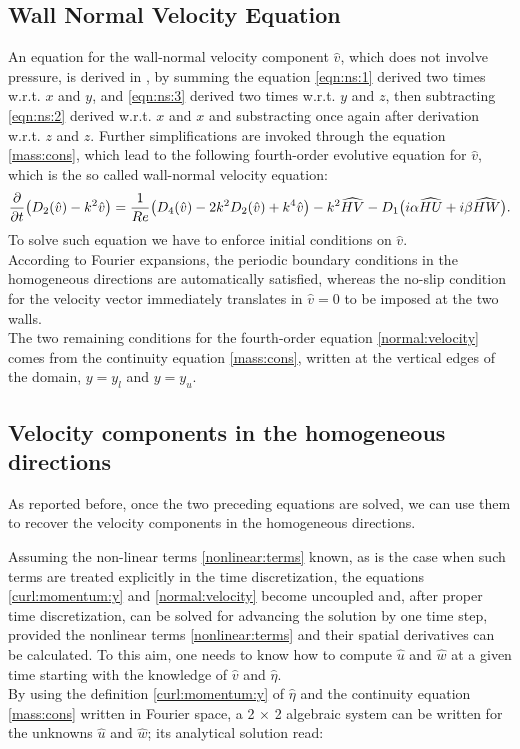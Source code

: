 \subsection{Wall Normal Velocity Equation}
An equation for the wall-normal velocity component $\hat{v}$, which does not involve pressure, is derived in \cite{kim_moin_moser}, by summing the equation \eqref{eqn:ns:1} derived two times w.r.t. $x$ and $y$, and \eqref{eqn:ns:3} derived two times w.r.t. $y$ and $z$, then subtracting \eqref{eqn:ns:2} derived w.r.t. $x$ and $x$ and substracting once again after derivation w.r.t. $z$ and $z$.
Further simplifications are invoked through the equation \eqref{mass:cons}, which lead to the following fourth-order evolutive equation for $\hat{v}$, which is the so called wall-normal velocity equation:
\begin{equation}
\frac{\partial}{\partial t} \big( D_{2}(\hat{v}) - k^{2} \hat{v} \big) = \frac{1}{Re} \big( D_{4}(\hat{v}) - 2k^{2} D_{2}(\hat{v}) + k^{4} \hat{v} \big)  \\
	-k^{2} \widehat{HV} - D_{1} \big(  i \alpha \widehat{HU} + i \beta \widehat{HW} \big).
\label{normal:velocity}
\end{equation}
To solve such equation we have to enforce initial conditions on $\hat{v}$.\\
According to Fourier expansions, the periodic boundary conditions in the homogeneous directions are automatically satisfied, whereas the no-slip condition for the velocity vector immediately translates in $\hat{v} = 0$ to be imposed at the two walls.\\
The two remaining conditions for the fourth-order equation \eqref{normal:velocity} comes from the continuity equation \eqref{mass:cons}, written at the vertical edges of the domain, $y= y_{l}$ and $y=y_{u}$.


\subsection{Velocity components in the homogeneous directions}
As reported before, once the two preceding equations are solved, we can use them to recover the velocity components in the homogeneous directions.\par
Assuming the non-linear terms \eqref{nonlinear:terms} known, as is the case when such terms are treated explicitly in the time discretization, the equations \eqref{curl:momentum:y} and \eqref{normal:velocity} become uncoupled and, after proper time discretization, can be solved for advancing the solution by one time step, provided the nonlinear terms \eqref{nonlinear:terms} and their spatial derivatives can be calculated.
To this aim, one needs to know how to compute $\hat{u}$ and $\hat{w}$ at a given time starting with the knowledge of $\hat{v}$ and $\hat{\eta}$. \\
By using the definition \eqref{curl:momentum:y} of $\hat{\eta}$ and the continuity equation \eqref{mass:cons} written in Fourier space, a 2 $\times$ 2 algebraic system can be written for the unknowns $\hat{u}$ and $\hat{w}$; its analytical solution read:

